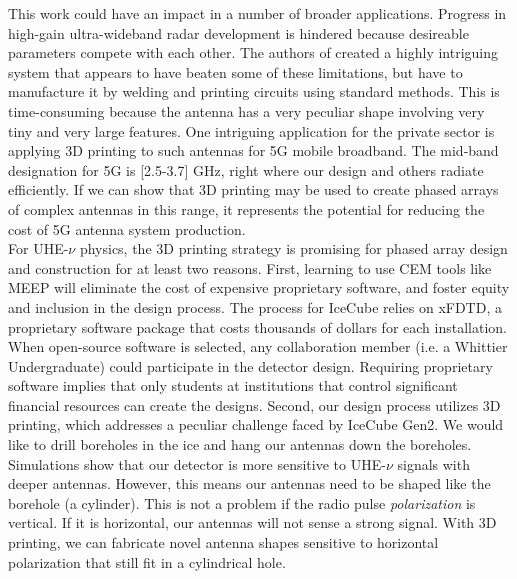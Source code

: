 \documentclass[../../../main.tex]{subfiles}
\begin{document}
This work could have an impact in a number of broader applications.  Progress in high-gain ultra-wideband radar development is hindered because desireable parameters compete with each other.  The authors of \cite{10.3390/electronics10121377} created a highly intriguing system that appears to have beaten some of these limitations, but have to manufacture it by welding and printing circuits using standard methods.  This is time-consuming because the antenna has a very peculiar shape involving very tiny and very large features.  One intriguing application for the private sector is applying 3D printing to such antennas for 5G mobile broadband.  The mid-band designation for 5G is [2.5-3.7] GHz, right where our design and others radiate efficiently.  If we can show that 3D printing may be used to create phased arrays of complex antennas in this range, it represents the potential for reducing the cost of 5G antenna system production.
\\
\vspace{0.25cm}
For UHE-$\nu$ physics, the 3D printing strategy is promising for phased array design and construction for at least two reasons.  First, learning to use CEM tools like MEEP will eliminate the cost of expensive proprietary software, and foster equity and inclusion in the design process.  The process for IceCube relies on xFDTD, a proprietary software package that costs thousands of dollars for each installation.  When open-source software is selected, any collaboration member (i.e. a Whittier Undergraduate) could participate in the detector design.  Requiring proprietary software implies that only students at institutions that control significant financial resources can create the designs.  Second, our design process utilizes 3D printing, which addresses a peculiar challenge faced by IceCube Gen2.  We would like to drill boreholes in the ice and hang our antennas down the boreholes.  Simulations show that our detector is more sensitive to UHE-$\nu$ signals with deeper antennas.  However, this means our antennas need to be shaped like the borehole (a cylinder).  This is not a problem if the radio pulse \textit{polarization} is vertical.  If it is horizontal, our antennas will not sense a strong signal.  With 3D printing, we can fabricate novel antenna shapes sensitive to horizontal polarization that still fit in a cylindrical hole.
\end{document}

